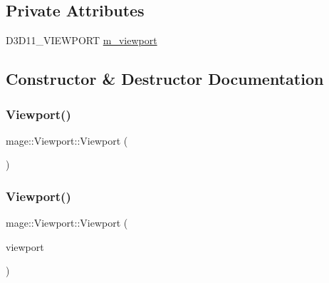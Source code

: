 \subsection*{Private Attributes}
\begin{DoxyCompactItemize}
\item 
D3\+D11\+\_\+\+V\+I\+E\+W\+P\+O\+RT \hyperlink{structmage_1_1_viewport_a9509003aae2c6cd0f33cfc875cd235f4}{m\+\_\+viewport}
\end{DoxyCompactItemize}


\subsection{Constructor \& Destructor Documentation}
\hypertarget{structmage_1_1_viewport_ab189482e477d46a63c514f59e09ca31b}{}\label{structmage_1_1_viewport_ab189482e477d46a63c514f59e09ca31b} 
\subsubsection{\texorpdfstring{Viewport()}{Viewport()}\hspace{0.1cm}{\footnotesize\ttfamily [1/5]}}
{\footnotesize\ttfamily mage\+::\+Viewport\+::\+Viewport (\begin{DoxyParamCaption}{ }\end{DoxyParamCaption})}

\hypertarget{structmage_1_1_viewport_a30e0141573acb18a4f8b1ef0aa46c8e0}{}\label{structmage_1_1_viewport_a30e0141573acb18a4f8b1ef0aa46c8e0} 
\subsubsection{\texorpdfstring{Viewport()}{Viewport()}\hspace{0.1cm}{\footnotesize\ttfamily [2/5]}}
{\footnotesize\ttfamily mage\+::\+Viewport\+::\+Viewport (\begin{DoxyParamCaption}\item[{const D3\+D11\+\_\+\+V\+I\+E\+W\+P\+O\+RT \&}]{viewport }\end{DoxyParamCaption})\hspace{0.3cm}{\ttfamily [explicit]}}

\hypertarget{structmage_1_1_viewport_a44d0f073e593ce4db5c88fad276ffbcf}{}\label{structmage_1_1_viewport_a44d0f073e593ce4db5c88fad276ffbcf} 

